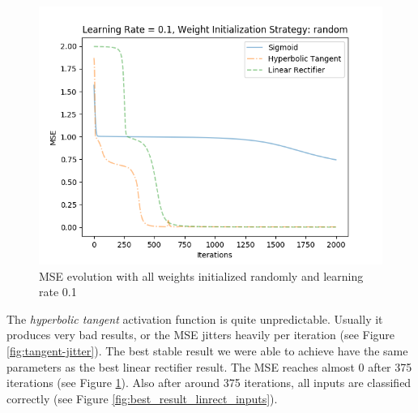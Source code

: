 \documentclass{article}
\begin{document}
\begin{figure}[H]
	\centering
	\includegraphics[width=0.9\linewidth]{img/5/linear-rectifier-mse.png}
	\caption{MSE evolution with all weights initialized randomly and learning rate 0.1}
	\label{fig:best_result_linrect_mse}
\end{figure}


The \emph{hyperbolic tangent} activation function is quite unpredictable. Usually it produces very bad results, or the MSE jitters heavily per iteration (see Figure \ref{fig:tangent-jitter}).
The best stable result we were able to achieve have the same parameters as the best linear rectifier result. The MSE reaches almost 0 after 375 iterations (see Figure \ref{fig:best_result_linrect_mse}). Also after around 375 iterations, all inputs are classified correctly (see Figure \ref{fig:best_result_linrect_inputs}).
\end{document}
